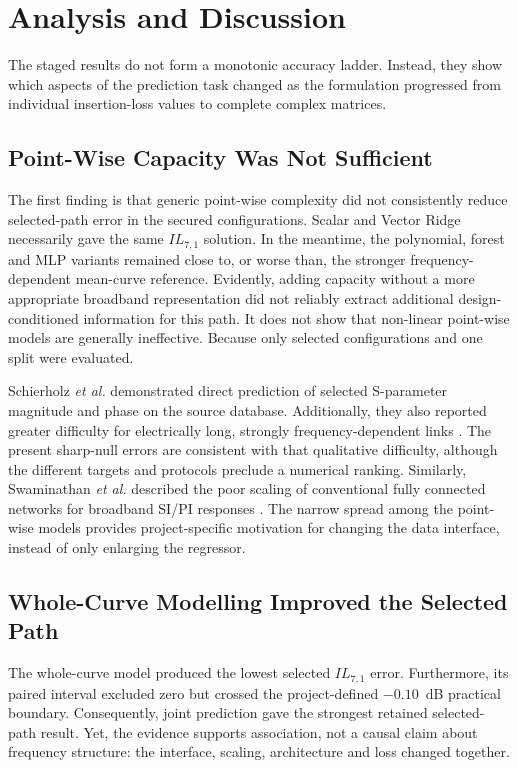 \section{Analysis and Discussion}
\label{sec:analysis}

The staged results do not form a monotonic accuracy ladder. Instead, they show
which aspects of the prediction task changed as the formulation progressed
from individual insertion-loss values to complete complex matrices.

\subsection{Point-Wise Capacity Was Not Sufficient}
The first finding is that generic point-wise complexity did not consistently
reduce selected-path error in the secured configurations. Scalar and Vector
Ridge necessarily gave the same $IL_{7,1}$ solution. In the meantime, the polynomial,
forest and MLP variants remained close to, or worse than, the stronger
frequency-dependent mean-curve reference. Evidently, adding capacity
without a more appropriate broadband representation did not reliably extract
additional design-conditioned information for this path. It does not show that
non-linear point-wise models are generally ineffective. Because only selected
configurations and one split were evaluated.

Schierholz \textit{et al.} demonstrated direct prediction of selected
S-parameter magnitude and phase on the source database. Additionally, they also reported
greater difficulty for electrically long, strongly frequency-dependent links
\cite{schierholz2021sipi}. The present sharp-null errors are consistent with
that qualitative difficulty, although the different targets and protocols
preclude a numerical ranking. Similarly, Swaminathan \textit{et al.} described
the poor scaling of conventional fully connected networks for broadband SI/PI
responses \cite{swaminathan2020demystifying}. The narrow spread among the
point-wise models provides project-specific motivation for changing the
data interface, instead of only enlarging the regressor.

\subsection{Whole-Curve Modelling Improved the Selected Path}
The whole-curve model produced the lowest selected $IL_{7,1}$ error. Furthermore, its
paired interval excluded zero but crossed the project-defined $-0.10$~dB
practical boundary. Consequently, joint prediction gave the strongest retained
selected-path result. Yet, the evidence supports association, not a causal claim
about frequency structure: the interface, scaling, architecture and loss
changed together.

